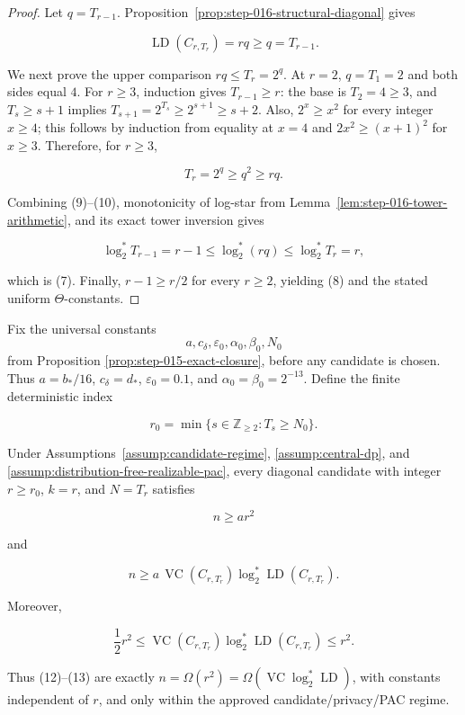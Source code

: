 \begin{proof}
Let \(q=T_{r-1}\). Proposition~\ref{prop:step-016-structural-diagonal}
gives

\[
\operatorname{LD}(C_{r,T_r})=rq\ge q=T_{r-1}.
\tag{9}
\]

We next prove the upper comparison \(rq\le T_r=2^q\). At \(r=2\),
\(q=T_1=2\) and both sides equal \(4\). For \(r\ge3\), induction gives
\(T_{r-1}\ge r\): the base is \(T_2=4\ge3\), and
\(T_s\ge s+1\) implies \(T_{s+1}=2^{T_s}\ge2^{s+1}\ge s+2\).
Also, \(2^x\ge x^2\) for every integer \(x\ge4\); this follows by
induction from equality at \(x=4\) and
\(2x^2\ge(x+1)^2\) for \(x\ge3\). Therefore, for \(r\ge3\),

\[
T_r=2^q\ge q^2\ge rq.
\tag{10}
\]

Combining (9)--(10), monotonicity of log-star from
Lemma~\ref{lem:step-016-tower-arithmetic}, and its exact tower inversion
gives

\[
\log_2^*T_{r-1}=r-1
\le\log_2^*(rq)
\le\log_2^*T_r=r,
\]

which is (7). Finally, \(r-1\ge r/2\) for every \(r\ge2\), yielding
(8) and the stated uniform \(\Theta\)-constants. \end{proof}

\begin{proposition}\label{prop:step-016-rate-bridge}
Fix the universal constants
\[
a,c_\delta,\varepsilon_0,\alpha_0,\beta_0,N_0
\]
from Proposition \ref{prop:step-015-exact-closure}, before any candidate is
chosen. Thus \(a=b_*/16\), \(c_\delta=d_*\), \(\varepsilon_0=0.1\), and
\(\alpha_0=\beta_0=2^{-13}\). Define
the finite deterministic index

\[
r_0=\min\{s\in\mathbb Z_{\ge2}:T_s\ge N_0\}.
\tag{11}
\]

Under Assumptions~\ref{assump:candidate-regime},
\ref{assump:central-dp}, and
\ref{assump:distribution-free-realizable-pac}, every diagonal candidate
with integer \(r\ge r_0\), \(k=r\), and \(N=T_r\) satisfies

\[
n\ge ar^2
\tag{12}
\]

and

\[
n\ge
a\,\operatorname{VC}(C_{r,T_r})
   \log_2^*\operatorname{LD}(C_{r,T_r}).
\tag{13}
\]

Moreover,

\[
\frac12r^2
\le
\operatorname{VC}(C_{r,T_r})
\log_2^*\operatorname{LD}(C_{r,T_r})
\le r^2.
\tag{14}
\]

Thus (12)--(13) are exactly
\(n=\Omega(r^2)=\Omega(\operatorname{VC}\log_2^*\operatorname{LD})\),
with constants independent of \(r\), and only within the approved
candidate/privacy/PAC regime.
\end{proposition}

